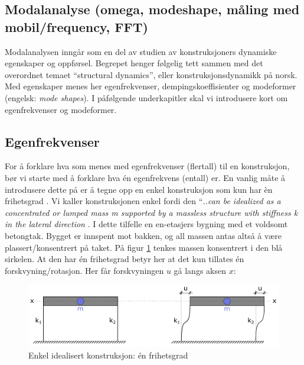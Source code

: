 \subsection{Modalanalyse (omega, modeshape, måling med mobil/frequency, FFT)} 

Modalanalysen inngår som en del av studien av konstruksjoners dynamiske egenskaper og oppførsel. Begrepet henger følgelig tett sammen med det overordnet temaet ``structural dynamics'', eller konstruksjonsdynamikk på norsk. Med egenskaper menes her egenfrekvenser, dempingskoeffisienter og modeformer (engelsk: \emph{mode shapes}). I påfølgende underkapitler skal vi introdusere kort om egenfrekvenser og modeformer.

\subsection{Egenfrekvenser}
For å forklare hva som menes med egenfrekvenser (flertall) til en konstruksjon, bør vi starte med å forklare hva én egenfrekvens (entall) er. En vanlig måte å introdusere dette på er å tegne opp en enkel konstruksjon som kun har èn frihetsgrad \parencite{CE809_FreeVibrationResponseOfSDFSystems}. Vi kaller konstruksjonen enkel fordi den ``\emph{..can be idealized as a concentrated or lumped mass \emph{m} supported by a massless structure with stiffness \emph{k} in the lateral direction} \parencite[s. 3]{Chopra2019-da}. I dette tilfelle en en-etasjers bygning med et voldsomt betongtak. Bygget er innspent mot bakken, og all massen antas altså å være plassert/konsentrert på taket. På figur \ref{fig:Enkel idealisert konstruksjon: én frihetsgrad} tenkes massen konsentrert i den blå sirkelen. At den har én frihetsgrad betyr her at det kun tillates én forskvyning/rotasjon. Her får forskvyningen $u$ gå langs aksen $x$:

\begin{figure}[h]
    \centering
    \includegraphics[width=\linewidth]{0 FIGURER/SDOF.pdf}
    \caption{Enkel idealisert konstruksjon: én frihetsgrad}
    \label{fig:Enkel idealisert konstruksjon: én frihetsgrad}
\end{figure}